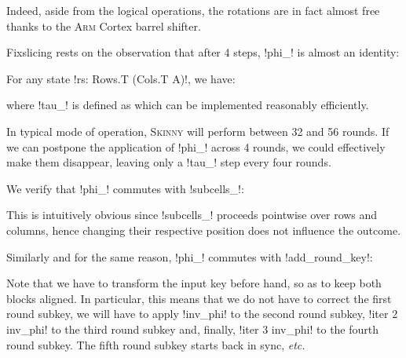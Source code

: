 \documentclass[draft,english]{jflart}
\newcommand{\etc}{\textit{etc.}}
\newcommand{\Skinny}{\textsc{Skinny}}
\begin{document}
Indeed, aside from the logical operations, the rotations are in fact
almost free thanks to the \textsc{Arm} Cortex barrel
shifter.


Fixslicing rests on the observation that after 4 steps, \coqe!phi_! is
almost an identity:
%
\begin{prop}
  For any state \coqe!rs: Rows.T (Cols.T A)!, we have:

  where \coqe!tau_! is defined as
  which can be implemented reasonably efficiently.
\end{prop}

In typical mode of operation, \Skinny{} will perform between 32 and 56
rounds. If we can postpone the application of \coqe!phi_! across 4
rounds, we could effectively make them disappear, leaving only a
\coqe!tau_! step every four rounds.


We verify that \coqe!phi_! commutes with \coqe!subcells_!:
%
\begin{prop}
\end{prop}

This is intuitively obvious since \coqe!subcells_! proceeds pointwise
over rows and columns, hence changing their respective position does
not influence the outcome.


Similarly and for the same reason, \coqe!phi_! commutes with
\coqe!add_round_key!:
%
\begin{prop}
\end{prop}

Note that we have to transform the input key before hand, so as to
keep both blocks aligned. In particular, this means that we do not
have to correct the first round subkey, we will have to apply
\coqe!inv_phi! to the second round subkey, \coqe!iter 2 inv_phi! to
the third round subkey and, finally, \coqe!iter 3 inv_phi! to the
fourth round subkey. The fifth round subkey starts back in sync,
\etc{}

\end{document}
